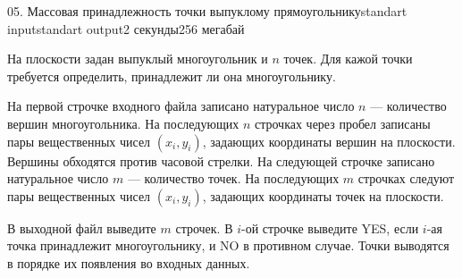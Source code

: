 \begin{problem}{05. Массовая принадлежность точки выпуклому прямоугольнику}{standart input}{standart output}{2 секунды}{256 мегабай}

На плоскости задан выпуклый многоугольник и $n$ точек. Для кажой точки требуется определить, принадлежит ли она многоугольнику.

\InputFile

На первой строчке входного файла записано натуральное число $n$ --- количество вершин многоугольника. На последующих $n$ строчках через пробел записаны пары вещественных чисел $(x_i, y_i)$, задающих координаты вершин на плоскости. Вершины обходятся против часовой стрелки. На следующей строчке записано натуральное число $m$ --- количество точек. На последующих $m$ строчках следуют пары вещественных чисел $(x_i, y_i)$, задающих координаты точек на плоскости.

\OutputFile

В выходной файл выведите $m$ строчек. В $i$-ой строчке выведите YES, если $i$-ая точка принадлежит многоугольнику, и NO в противном случае. Точки выводятся в порядке их появления во входных данных.

\Examples

\begin{example}%
%
\end{example}

\end{problem}
